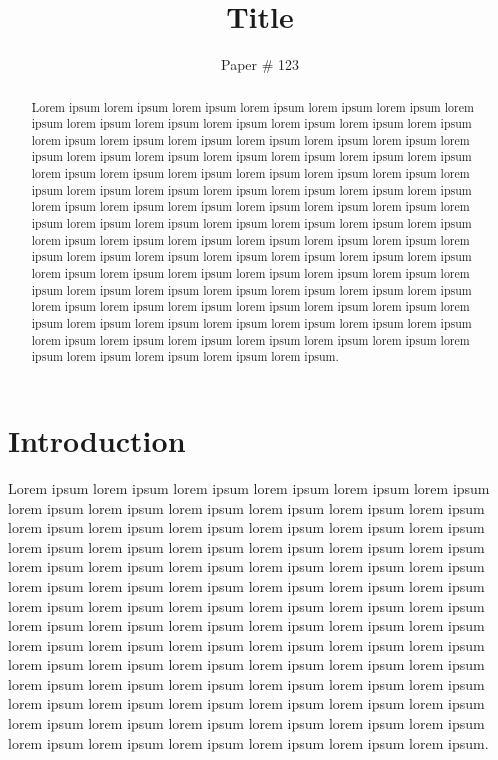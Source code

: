 \documentclass[10pt,twocolumn]{article}
\begin{document}
\title{\bf Title}
\author{Paper \# 123}
\date{}
\maketitle
\thispagestyle{empty}

\begin{abstract}
Lorem ipsum lorem ipsum lorem ipsum lorem ipsum lorem ipsum lorem ipsum
lorem ipsum lorem ipsum lorem ipsum lorem ipsum lorem ipsum lorem ipsum
lorem ipsum lorem ipsum lorem ipsum lorem ipsum lorem ipsum lorem ipsum
lorem ipsum lorem ipsum lorem ipsum lorem ipsum lorem ipsum lorem ipsum
lorem ipsum lorem ipsum lorem ipsum lorem ipsum lorem ipsum lorem ipsum
lorem ipsum lorem ipsum lorem ipsum lorem ipsum lorem ipsum lorem ipsum
lorem ipsum lorem ipsum lorem ipsum lorem ipsum lorem ipsum lorem ipsum
lorem ipsum lorem ipsum lorem ipsum lorem ipsum lorem ipsum lorem ipsum
lorem ipsum lorem ipsum lorem ipsum lorem ipsum lorem ipsum lorem ipsum
lorem ipsum lorem ipsum lorem ipsum lorem ipsum lorem ipsum lorem ipsum
lorem ipsum lorem ipsum lorem ipsum lorem ipsum lorem ipsum lorem ipsum
lorem ipsum lorem ipsum lorem ipsum lorem ipsum lorem ipsum lorem ipsum
lorem ipsum lorem ipsum lorem ipsum lorem ipsum lorem ipsum lorem ipsum
lorem ipsum lorem ipsum lorem ipsum lorem ipsum lorem ipsum lorem ipsum
lorem ipsum lorem ipsum lorem ipsum lorem ipsum lorem ipsum lorem ipsum
lorem ipsum lorem ipsum lorem ipsum lorem ipsum lorem ipsum lorem ipsum
lorem ipsum lorem ipsum lorem ipsum lorem ipsum lorem ipsum lorem ipsum.
\end{abstract}

\section{Introduction}

Lorem ipsum lorem ipsum lorem ipsum lorem ipsum lorem ipsum lorem ipsum
lorem ipsum lorem ipsum lorem ipsum lorem ipsum lorem ipsum lorem ipsum
lorem ipsum lorem ipsum lorem ipsum lorem ipsum lorem ipsum lorem ipsum
lorem ipsum lorem ipsum lorem ipsum lorem ipsum lorem ipsum lorem ipsum
lorem ipsum lorem ipsum lorem ipsum lorem ipsum lorem ipsum lorem ipsum
lorem ipsum lorem ipsum lorem ipsum lorem ipsum lorem ipsum lorem ipsum
lorem ipsum lorem ipsum lorem ipsum lorem ipsum lorem ipsum lorem ipsum
lorem ipsum lorem ipsum lorem ipsum lorem ipsum lorem ipsum lorem ipsum
lorem ipsum lorem ipsum lorem ipsum lorem ipsum lorem ipsum lorem ipsum
lorem ipsum lorem ipsum lorem ipsum lorem ipsum lorem ipsum lorem ipsum
lorem ipsum lorem ipsum lorem ipsum lorem ipsum lorem ipsum lorem ipsum
lorem ipsum lorem ipsum lorem ipsum lorem ipsum lorem ipsum lorem ipsum
lorem ipsum lorem ipsum lorem ipsum lorem ipsum lorem ipsum lorem ipsum
lorem ipsum lorem ipsum lorem ipsum lorem ipsum lorem ipsum lorem ipsum.
\end{document}
